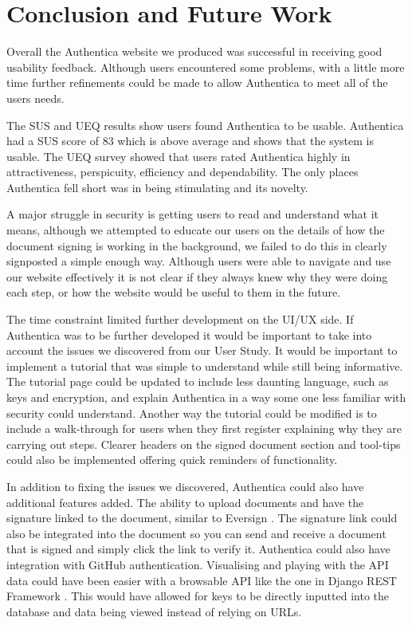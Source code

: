 \documentclass[a4,12pt]{article}
\begin{document}

\section*{Conclusion and Future Work}
Overall the Authentica website we produced was successful in receiving good usability feedback. Although users encountered some problems, with a little more time further refinements could be made to allow Authentica to meet all of the users needs.

The SUS and UEQ results show users found Authentica to be usable. Authentica had a SUS score of 83 which is above average and shows that the system is usable. The UEQ survey showed that users rated Authentica highly in attractiveness, perspicuity, efficiency and dependability. The only places Authentica fell short was in being stimulating and its novelty.

A major struggle in security is getting users to read and understand what it means, although we attempted to educate our users on the details of how the document signing is working in the background, we failed to do this in clearly signposted a simple enough way. Although users were able to navigate and use our website effectively it is not clear if they always knew why they were doing each step, or how the website would be useful to them in the future.

The time constraint limited further development on the UI/UX side. If Authentica was to be further developed it would be important to take into account the issues we discovered from our User Study. It would be important to implement a tutorial that was simple to understand while still being informative. The tutorial page could be updated to include less daunting language, such as keys and encryption, and explain Authentica in a way some one less familiar with security could understand. Another way the tutorial could be modified is to include a walk-through for users when they first register explaining why they are carrying out steps. Clearer headers on the signed document section and tool-tips could also be implemented offering quick reminders of functionality.

In addition to fixing the issues we discovered, Authentica could also have additional features added. The ability to upload documents and have the signature linked to the document, similar to Eversign \cite{eversign}. The signature link could also be integrated into the document so you can send and receive a document that is signed and simply click the link to verify it. Authentica could also have integration with GitHub authentication. Visualising and playing with the API data could have been easier with a browsable API like the one in Django REST Framework \cite{DRF}. This would have allowed for keys to be directly inputted into the database and data being viewed instead of relying on URLs.
\end{document}
